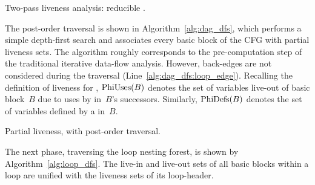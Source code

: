 \begin{algorithm}[H]
    \caption{Two-pass liveness analysis: reducible \@CFG.}
  \label{alg:twopass}
\end{algorithm}

The post-order traversal is shown in Algorithm~\ref{alg:dag_dfs}, which performs a simple depth-first search and associates every basic block of the CFG with partial liveness sets.
The algorithm roughly corresponds to the pre-computation step of the traditional iterative data-flow analysis.
However, back-edges are not considered during the traversal (Line~\ref{alg:dag_dfs:loop_edge}).
Recalling the definition of liveness for \phifuns, $\textrm{PhiUses}(B)$ denotes the set of variables live-out of basic block~$B$ due to uses by \phifuns in~$B$'s successors.
Similarly, $\textrm{PhiDefs}(B)$ denotes the set of variables defined by a \phifun in~$B$.

\begin{algorithm}[H]
  \caption{Partial liveness, with post-order traversal.}
  \label{alg:dag_dfs}
\end{algorithm}

The next phase, traversing the loop nesting forest, is shown by Algorithm~\ref{alg:loop_dfs}.
The live-in and live-out sets of all basic blocks within a loop are unified with the liveness sets of its loop-header.


